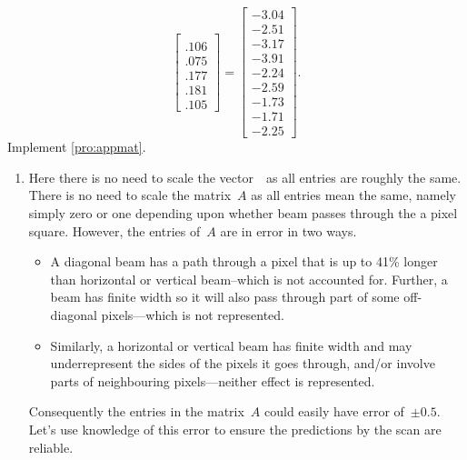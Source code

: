 \begin{example}
\begin{solution}
\begin{equation*}
\begin{bmatrix}
\\ .106
\\ .075
\\ .177
\\ .181
\\ .105 \end{bmatrix}
=\begin{bmatrix} -3.04
\\ -2.51
\\ -3.17
\\ -3.91
\\ -2.24
\\ -2.59
\\ -1.73
\\ -1.71
\\ -2.25 \end{bmatrix}.
\end{equation*}
\setbox\ajrqrbox\hbox{}%
\marginpar{\usebox{\ajrqrbox\\[2ex]}}%
Implement \autoref{pro:appmat}.
\begin{enumerate}
\item Here there is no need to scale the vector~\bv\ as all entries are roughly the same.
There is no need to scale the matrix~\(A\) as all entries mean the same, namely simply zero or one depending upon whether  beam passes through the a pixel square.
However, the entries of~\(A\) are in error in two ways.
\begin{itemize}
\item A diagonal beam has a path through a pixel that is up to 41\% longer than horizontal or vertical beam--which is not accounted for.  Further, a beam has finite width so it will also pass through part of some off-diagonal pixels---which is not represented.
\item Similarly, a horizontal or vertical beam has finite width and may underrepresent the sides of the pixels it goes through, and/or involve parts of neighbouring pixels---neither effect is represented.
\end{itemize}
Consequently the entries in the matrix~\(A\) could easily have error of~\(\pm0.5\).
Let's use knowledge of this error to ensure the predictions by the scan are reliable.


\end{enumerate}
\end{solution}
\end{example}
